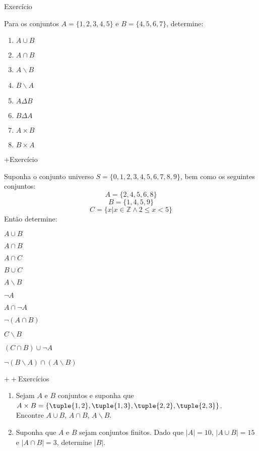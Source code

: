 \begin{frame}{Exercício}

  Para os conjuntos $A=\{1,2,3,4,5\}$ e $B=\{4,5,6,7\}$, determine:

  \begin{enumerate}
  \item $A\cup B$
  \item $A\cap B$
  \item $A\backslash B$
  \item $B\backslash A$
  \item $A\Delta B$
  \item $B\Delta A$
  \item $A\times B$
  \item $B\times A$
  \end{enumerate}

\end{frame}

\begin{frame}{$+$Exercício}
  
  Suponha o conjunto universo $S=\{0,1,2,3,4,5,6,7,8,9\}$, bem como 
  os seguintes conjuntos:
  \[A=\{2,4,5,6,8\}\]
  \[B=\{1,4,5,9\}\]
  \[C=\{x|x\in \mathbb{Z} \wedge 2\leq x<5\}\]
  \noindent Então determine:
  \bigskip
  \begin{enumerate}
    \begin{minipage}{.25\textwidth}
    \item $A\cup B$
    \item $A\cap B$
    \item $A\cap C$
    \item $B\cup C$
    \item $A\backslash B$
    \item $\neg A$
    \end{minipage}
    \begin{minipage}{.25\textwidth}
    \item $A\cap\neg A$
    \item $\neg (A\cap B)$
    \item $C\backslash B$
    \item $(C\cap B) \cup \neg A$
    \item $\neg (B\backslash A)\cap (A\backslash B)$
    \end{minipage}
  \end{enumerate}
  
\end{frame}

\begin{frame}{$++$Exercícios}

\begin{enumerate}
  \item Sejam $A$ e $B$ conjuntos e suponha que 
  $A\times B=\{\tuple{1,2},\tuple{1,3},\tuple{2,2},\tuple{2,3}\}$.\\
  Encontre $A\cup B$, $A\cap B$, $A\backslash B$.
\item Suponha que $A$ e $B$ sejam conjuntos finitos. Dado que $|A|=10$, 
 $|A\cup B|=15$ e $|A\cap B|=3$, determine $|B|$.
\end{enumerate}

\end{frame}

